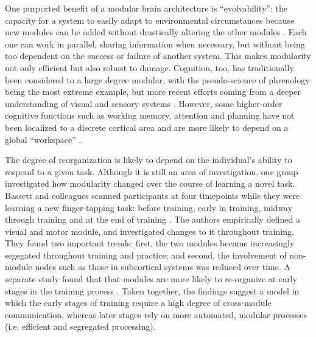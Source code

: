 One purported benefit of a modular brain architecture is ``evolvability'': the capacity for a system to easily adapt to environmental circumstances because new modules can be added without drastically altering the other modules \citep{Kashtan2005}. Each one can work in parallel, sharing information when necessary, but without being too dependent on the success or failure of another system. This makes modularity not only efficient but also robust to damage. Cognition, too, has traditionally been considered to a large degree modular, with the pseudo-science of phrenology being the most extreme example, but more recent efforts coming from a deeper understanding of visual and sensory systems \citep{Barrett2006}. However, some higher-order cognitive functions such as working memory, attention and planning have not been localized to a discrete cortical area and are more likely to depend on a global ``workspace'' \citep{Dehaene1998}.

The degree of reorganization is likely to depend on the individual's ability to respond to a given task. Although it is still an area of investigation, one group investigated how modularity changed over the course of learning a novel task. Bassett and colleagues scanned participants at four timepoints while they were learning a new finger-tapping task: before training, early in training, midway through training and at the end of training \citep{Bassett2015}. The authors empirically defined a visual and motor module, and investigated changes to it throughout training. They found two important trends: first, the two modules became increasingly segegated throughout training and practice; and second, the involvement of non-module nodes such as those in subcortical systems was reduced over time. A separate study found that that modules are more likely to re-organize at early stages in the training process \citep{Bassett2010}. Taken together, the findings suggest a model in which the early stages of training require a high degree of cross-module communication, whereas later stages rely on more automated, modular processes (i.e. efficient and segregated processing). 

